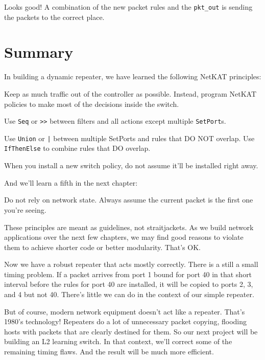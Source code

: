 Looks good!  A combination of the new packet rules and the \texttt{pkt\_out} 
is sending the packets to the correct place.  

\section{Summary}

In building a dynamic repeater, we have learned the following NetKAT principles:

\setcounter{principle}{0}

\begin{principle}
Keep as much traffic out of the controller as possible.
Instead, program NetKAT policies to make most of the decisions inside the switch.  
\end{principle}

\begin{principle}
Use \texttt{Seq} or \texttt{>>} between filters and all actions except multiple \texttt{SetPort}s.
\end{principle}

\begin{principle}
Use \texttt{Union} or \texttt{|} between multiple SetPorts and rules that DO NOT overlap.
Use \texttt{IfThenElse} to combine rules that DO overlap. 
\end{principle}

\begin{principle}
When you install a new switch policy, do not assume it'll be installed right away.  
\end{principle}

And we'll learn a fifth in the next chapter:

\begin{principle}
Do not rely on network state.  Always assume the current packet is the first one you're seeing.   
\end{principle}

These principles are meant as guidelines, not straitjackets.
As we build network applications over the next few chapters, we may find good reasons to violate them 
to achieve shorter code or better modularity.
That's OK. 

Now we have a robust repeater that acts mostly correctly.  There is a still a small timing problem.  If a packet
arrives from port 1 bound for port 40 in that short interval before the rules for port 40 are installed, it
will be copied to ports 2, 3, and 4 but not 40.  There's little we can do in the context of our simple repeater.

But of course, modern network equipment doesn't act like a repeater.  That's 1980's technology!  Repeaters
do a lot of unnecessary packet copying, flooding hosts with packets that are clearly destined for them.  
So our next project will be building an L2 learning switch.  In that context, we'll correct some of the 
remaining timing flaws.  And the result will be much more efficient. 

